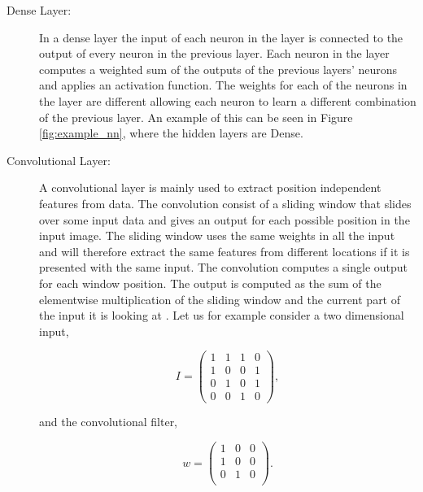 \begin{description}

    \item[Dense Layer:]

        In a dense layer the input of each neuron in the layer is connected to
        the output of every neuron in the previous layer. Each neuron in the
        layer computes a weighted sum of the outputs of the previous layers'
        neurons and applies an activation function. The weights for each of
        the neurons in the layer are different allowing each neuron to learn a
        different combination of the previous layer. An example of this can be
        seen in Figure \ref{fig:example_nn}, where the hidden layers are Dense.

    \item[Convolutional Layer:]

        A convolutional layer is mainly used to extract position independent
        features from data. The convolution consist of a sliding window that
        slides over some input data and gives an output for each possible
        position in the input image. The sliding window uses the same weights
        in all the input and will therefore extract the same features from
        different locations if it is presented with the same input. The
        convolution computes a single output for each window position. The
        output is computed as the sum of the elementwise multiplication of
        the sliding window and the current part of the input it is looking at
        \cite{oshea2015}. Let us for example consider a two dimensional input,

        \begin{equation}
            I = \begin{pmatrix}
                1 & 1 & 1 & 0 \\
                1 & 0 & 0 & 1 \\
                0 & 1 & 0 & 1 \\
                0 & 0 & 1 & 0
            \end{pmatrix},
        \end{equation}

        and the convolutional filter,

        \begin{equation}
            w = \begin{pmatrix}
                1 & 0 & 0 \\
                1 & 0 & 0 \\
                0 & 1 & 0 \\
            \end{pmatrix}.
        \end{equation}


\end{description}
